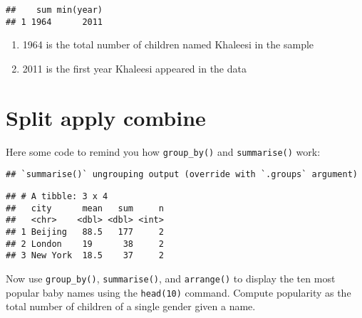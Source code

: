 \documentclass[
]{article}
\newenvironment{Shaded}{\begin{snugshade}}{\end{snugshade}}
\newcommand{\DataTypeTok}[1]{\textcolor[rgb]{0.13,0.29,0.53}{#1}}
\newcommand{\DecValTok}[1]{\textcolor[rgb]{0.00,0.00,0.81}{#1}}
\newcommand{\KeywordTok}[1]{\textcolor[rgb]{0.13,0.29,0.53}{\textbf{#1}}}
\newcommand{\NormalTok}[1]{#1}
\newcommand{\OperatorTok}[1]{\textcolor[rgb]{0.81,0.36,0.00}{\textbf{#1}}}
\newcommand{\StringTok}[1]{\textcolor[rgb]{0.31,0.60,0.02}{#1}}
\providecommand{\tightlist}{%
  \setlength{\itemsep}{0pt}\setlength{\parskip}{0pt}}
\begin{document}
\begin{verbatim}
##    sum min(year)
## 1 1964      2011
\end{verbatim}

\begin{enumerate}
\def\labelenumi{\arabic{enumi}.}
\tightlist
\item
  1964 is the total number of children named Khaleesi in the sample
\item
  2011 is the first year Khaleesi appeared in the data
\end{enumerate}

\hypertarget{split-apply-combine}{%
\section{Split apply combine}\label{split-apply-combine}}

Here some code to remind you how \texttt{group\_by()} and
\texttt{summarise()} work:

\begin{Shaded}
\end{Shaded}

\begin{verbatim}
## `summarise()` ungrouping output (override with `.groups` argument)
\end{verbatim}

\begin{verbatim}
## # A tibble: 3 x 4
##   city      mean   sum     n
##   <chr>    <dbl> <dbl> <int>
## 1 Beijing   88.5   177     2
## 2 London    19      38     2
## 3 New York  18.5    37     2
\end{verbatim}

Now use \texttt{group\_by()}, \texttt{summarise()}, and
\texttt{arrange()} to display the ten most popular baby names using the
\texttt{head(10)} command. Compute popularity as the total number of
children of a single gender given a name.

\begin{Shaded}
\end{Shaded}
\end{document}
